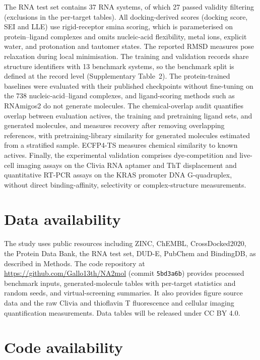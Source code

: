 \documentclass[pdflatex,sn-mathphys-num]{sn-jnl}
\theoremstyle{thmstyleone}
\theoremstyle{thmstyletwo}
\theoremstyle{thmstylethree}
\begin{document}
The RNA test set contains 37 RNA systems, of which 27 passed validity filtering (exclusions in the per-target tables). All docking-derived scores (docking score, SEI and LLE) use rigid-receptor smina scoring, which is parameterised on protein--ligand complexes and omits nucleic-acid flexibility, metal ions, explicit water, and protonation and tautomer states. The reported RMSD measures pose relaxation during local minimisation. The training and validation records share structure identifiers with 13 benchmark systems, so the benchmark split is defined at the record level (Supplementary Table~2). The protein-trained baselines were evaluated with their published checkpoints without fine-tuning on the 738 nucleic-acid--ligand complexes, and ligand-scoring methods such as RNAmigos2 \cite{rnamigos2025} do not generate molecules. The chemical-overlap audit quantifies overlap between evaluation actives, the training and pretraining ligand sets, and generated molecules, and measures recovery after removing overlapping references, with pretraining-library similarity for generated molecules estimated from a stratified sample. ECFP4-TS measures chemical similarity to known actives. Finally, the experimental validation comprises dye-competition and live-cell imaging assays on the Clivia RNA aptamer and ThT displacement and quantitative RT-PCR assays on the KRAS promoter DNA G-quadruplex, without direct binding-affinity, selectivity or complex-structure measurements.

\section*{Data availability}

The study uses public resources including ZINC, ChEMBL, CrossDocked2020, the Protein Data Bank, the RNA test set, DUD-E, PubChem and BindingDB, as described in Methods. The code repository at \url{https://github.com/Gallo13th/NA2mol} (commit \texttt{5bd3a6b}) provides processed benchmark inputs, generated-molecule tables with per-target statistics and random seeds, and virtual-screening summaries. It also provides figure source data and the raw Clivia and thioflavin T fluorescence and cellular imaging quantification measurements. Data tables will be released under CC BY 4.0.

\section*{Code availability}
\end{document}
